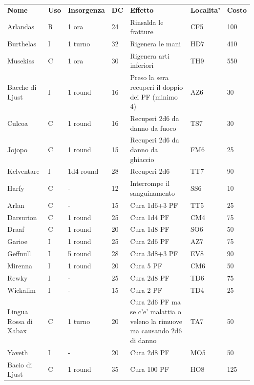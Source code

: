 \documentclass[a4paper,11pt,twoside,openany]{book}
\begin{document}
{		\begin{longtable}{|L{3.2cm} |k{0.7cm} |k{1.7cm}| D{1cm} |L{5cm} |k{1.5cm} |k{1cm}|}
			\textbf{Nome} & \textbf{Uso} & \textbf{Insorgenza} & \textbf{DC} & \textbf{Effetto} & \textbf{Localita'} & \textbf{Costo}\\
			Arlandas & R & 1 ora & 24 & Rinsalda le fratture & CF5 & 100\\
			Burthelas  & I & 1 turno & 32 & Rigenera le mani & HD7 & 410\\
			Musekiss& C & 1 ora & 30 & Rigenera arti inferiori & TH9 & 550\\
			Bacche di Ljust  & I & 1 round & 16 & Preso la sera recuperi il doppio dei PF (minimo 4)& AZ6 & 30\\
			Culcoa& C & 1 round & 16 & Recuperi 2d6 da danno da fuoco & TS7 & 30\\
			Jojopo & C & 1 round & 15 & Recuperi 2d6 da danno da ghiaccio & FM6 & 25\\
			Kelventare & I & 1d4 round & 28 & Recuperi 2d6 & TT7 & 90\\
			Harfy  & C & - & 12 & Interrompe il sanguinamento & SS6 & 10\\
			Arlan & C & - & 15 & Cura 1d6+3 PF & TT5 & 25\\
			Darsurion & C & 1 round & 25 & Cura 1d4 PF & CM4 & 75\\
			Draaf  & C & 1 round & 20 & Cura 1d8 PF & SO6 & 50\\
			Garioe & I & 1 round & 25 & Cura 2d6 PF & AZ7 & 75\\
			Geffnull & I & 5 round & 28 & Cura 3d8+3 PF & EV8 & 90\\
			Mirenna & I & 1 round & 20 & Cura 5 PF & CM6 & 50\\
			Rewky & I & - & 25 & Cura 2d8 PF & TD6 & 75\\
			Wickalim & I & - & 15 & Cura 2 PF & TD4 & 25\\
			Lingua Rossa di Xabax& C & 1 turno & 20 & Cura 2d6 PF ma se c'e' malattia o veleno la rimuove ma causando 2d6 di danno& TA7 & 50\\
			Yaveth & I & - & 20 & Cura 2d8 PF & MO5 & 50\\
			Bacio di Ljust & C & 1 round & 35 & Cura 100 PF & HO8 & 125\\

\end{longtable}}
\end{document}

